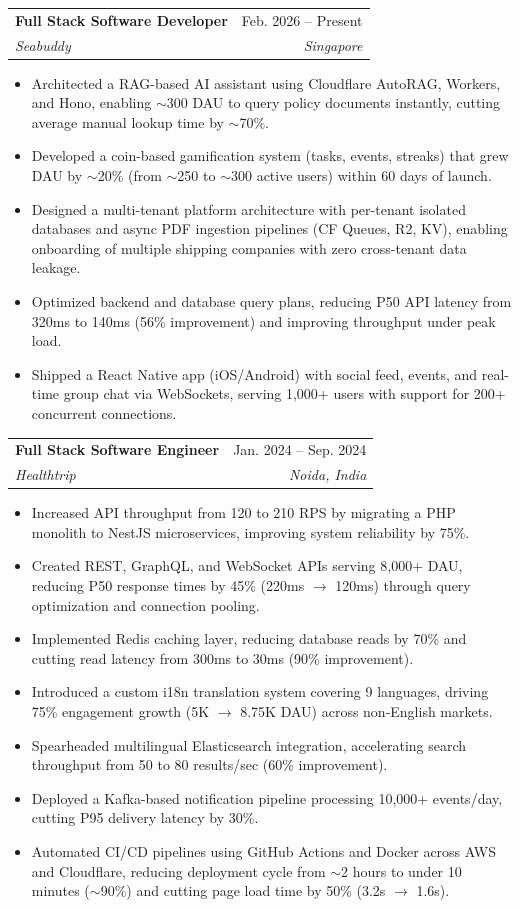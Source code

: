 \documentclass[letterpaper,11pt]{article}
\makeatletter
\newcommand{\resumeItem}[1]{
  \item\small{
    {#1 \vspace{-2pt}}
  }
}
\newcommand{\resumeSubheading}[4]{
  \vspace{-2pt}\item
    \begin{tabular*}{0.97\textwidth}[t]{l@{\extracolsep{\fill}}r}
      \textbf{#1} & #2 \\
      \textit{\small#3} & \textit{\small #4} \\
    \end{tabular*}
}
\newcommand{\resumeItemListStart}{\begin{itemize}}
\newcommand{\resumeItemListEnd}{\end{itemize}\vspace{-5pt}}
\makeatother
\begin{document}
\resumeSubheading
{Full Stack Software Developer}{Feb. 2026 -- Present}
{Seabuddy}{Singapore}
\resumeItemListStart
\resumeItem{Architected a RAG-based AI assistant using Cloudflare AutoRAG, Workers, and Hono, enabling $\sim$300 DAU to query policy documents instantly, cutting average manual lookup time by $\sim$70\%.}
\resumeItem{Developed a coin-based gamification system (tasks, events, streaks) that grew DAU by $\sim$20\% (from $\sim$250 to $\sim$300 active users) within 60 days of launch.}
\resumeItem{Designed a multi-tenant platform architecture with per-tenant isolated databases and async PDF ingestion pipelines (CF Queues, R2, KV), enabling onboarding of multiple shipping companies with zero cross-tenant data leakage.}
\resumeItem{Optimized backend and database query plans, reducing P50 API latency from 320ms to 140ms (56\% improvement) and improving throughput under peak load.}
\resumeItem{Shipped a React Native app (iOS/Android) with social feed, events, and real-time group chat via WebSockets, serving 1,000+ users with support for 200+ concurrent connections.}
\resumeItemListEnd

\resumeSubheading
{Full Stack Software Engineer}{Jan. 2024 -- Sep. 2024}
{Healthtrip}{Noida, India}
\resumeItemListStart
\resumeItem{Increased API throughput from 120 to 210 RPS by migrating a PHP monolith to NestJS microservices, improving system reliability by 75\%.}
\resumeItem{Created REST, GraphQL, and WebSocket APIs serving 8,000+ DAU, reducing P50 response times by 45\% (220ms $\to$ 120ms) through query optimization and connection pooling.}
\resumeItem{Implemented Redis caching layer, reducing database reads by 70\% and cutting read latency from 300ms to 30ms (90\% improvement).}
\resumeItem{Introduced a custom i18n translation system covering 9 languages, driving 75\% engagement growth (5K $\to$ 8.75K DAU) across non-English markets.}
\resumeItem{Spearheaded multilingual Elasticsearch integration, accelerating search throughput from 50 to 80 results/sec (60\% improvement).}
\resumeItem{Deployed a Kafka-based notification pipeline processing 10,000+ events/day, cutting P95 delivery latency by 30\%.}
\resumeItem{Automated CI/CD pipelines using GitHub Actions and Docker across AWS and Cloudflare, reducing deployment cycle from $\sim$2 hours to under 10 minutes ($\sim$90\%) and cutting page load time by 50\% (3.2s $\to$ 1.6s).}
\resumeItemListEnd
\end{document}
